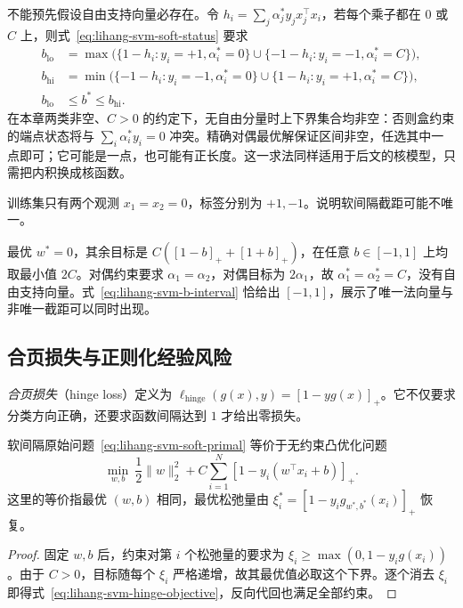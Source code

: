 不能预先假设自由支持向量必存在。令 $h_i=\sum_j\alpha_j^*y_j x_j^\top x_i$，若每个乘子都在 $0$ 或 $C$ 上，则式~\eqref{eq:lihang-svm-soft-status} 要求
\begin{align}
  b_{\mathrm{lo}}
    &=\max\bigl(\{1-h_i:y_i=+1,\alpha_i^*=0\}
           \cup\{-1-h_i:y_i=-1,\alpha_i^*=C\}\bigr),\\
  b_{\mathrm{hi}}
    &=\min\bigl(\{-1-h_i:y_i=-1,\alpha_i^*=0\}
           \cup\{1-h_i:y_i=+1,\alpha_i^*=C\}\bigr),\\
  b_{\mathrm{lo}}&\le b^*\le b_{\mathrm{hi}}.
  \label{eq:lihang-svm-b-interval}
\end{align}
在本章两类非空、$C>0$ 的约定下，无自由分量时上下界集合均非空：否则盒约束的端点状态将与 $\sum_i\alpha_i^*y_i=0$ 冲突。精确对偶最优解保证区间非空，任选其中一点即可；它可能是一点，也可能有正长度。这一求法同样适用于后文的核模型，只需把内积换成核函数。

\begin{example}
\label{ex:lihang-svm-nonunique-b}
训练集只有两个观测 $x_1=x_2=0$，标签分别为 $+1,-1$。说明软间隔截距可能不唯一。
\end{example}
\begin{solve}
最优 $w^*=0$，其余目标是 $C([1-b]_++[1+b]_+)$，在任意 $b\in[-1,1]$ 上均取最小值 $2C$。对偶约束要求 $\alpha_1=\alpha_2$，对偶目标为 $2\alpha_1$，故 $\alpha_1^*=\alpha_2^*=C$，没有自由支持向量。式~\eqref{eq:lihang-svm-b-interval} 恰给出 $[-1,1]$，展示了唯一法向量与非唯一截距可以同时出现。
\end{solve}

\subsection{合页损失与正则化经验风险}

\begin{definition}[合页损失]
\emph{合页损失}（hinge loss）定义为 $\ell_{\mathrm{hinge}}(g(x),y)=[1-yg(x)]_+$。它不仅要求分类方向正确，还要求函数间隔达到 $1$ 才给出零损失。
\end{definition}

\begin{proposition}[消去松弛变量]
\label{prop:lihang-svm-hinge}
软间隔原始问题~\eqref{eq:lihang-svm-soft-primal} 等价于无约束凸优化问题
\begin{equation}
  \min_{w,b}\ \frac12\lVert w\rVert_2^2
      +C\sum_{i=1}^{N}[1-y_i(w^\top x_i+b)]_+.
  \label{eq:lihang-svm-hinge-objective}
\end{equation}
这里的等价指最优 $(w,b)$ 相同，最优松弛量由 $\xi_i^*=[1-y_i g_{w^*,b^*}(x_i)]_+$ 恢复。
\end{proposition}
\begin{proof}
固定 $w,b$ 后，约束对第 $i$ 个松弛量的要求为 $\xi_i\ge\max(0,1-y_i g(x_i))$。由于 $C>0$，目标随每个 $\xi_i$ 严格递增，故其最优值必取这个下界。逐个消去 $\xi_i$ 即得式~\eqref{eq:lihang-svm-hinge-objective}，反向代回也满足全部约束。
\end{proof}

